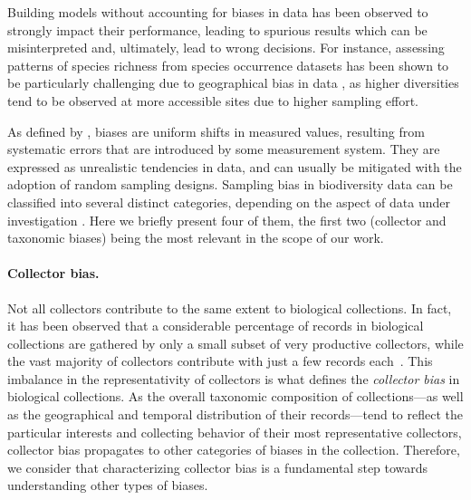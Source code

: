 Building models without accounting for biases in data has been observed to strongly impact their performance, leading to spurious results which can be misinterpreted and, ultimately, lead to wrong decisions.
For instance, assessing patterns of species richness from species occurrence datasets has been shown to be particularly challenging due to geographical bias in data \cite{Hortal2007,Reddy2003}, as higher diversities tend to be observed at more accessible sites due to higher sampling effort.

As defined by , biases are uniform shifts in measured values, resulting from systematic errors that are introduced by some measurement system.
They are expressed as unrealistic tendencies in data, and can usually be mitigated with the adoption of random sampling designs.
%
Sampling bias in biodiversity data can be classified into several distinct categories, depending on the aspect of data under investigation \cite{Daru2017}.
Here we briefly present four of them, the first two (collector and taxonomic biases) being the most relevant in the scope of our work.
%
\paragraph*{Collector bias.}
Not all collectors contribute to the same extent to biological collections.
In fact, it has been observed that a considerable percentage of records in biological collections are gathered by only a small subset of very productive collectors, while the vast majority of collectors contribute with just a few records each~\cite{Daru2017,Carine2012}.
This imbalance in the representativity of collectors is what defines the \textit{collector bias} in biological collections.
As the overall taxonomic composition of collections---as well as the geographical and temporal distribution of their records---tend to reflect the particular interests and collecting behavior of their most representative collectors, collector bias propagates to other categories of biases in the collection. Therefore, we consider that characterizing collector bias is a fundamental step towards understanding other types of biases.

